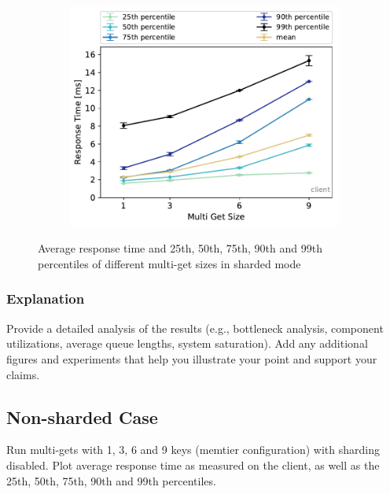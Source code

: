 \documentclass[11pt,a4paper]{article}
\begin{document}
\begin{figure}
	\begin{subfigure}[b]{.49\linewidth}
		\centering
		\includegraphics[width=\linewidth]{data/exp51_sharded_rt_mget_perc_client.pdf}
	\end{subfigure}\hfill
	\begin{subfigure}[b]{.49\linewidth}
		
	\end{subfigure}%
	\caption{Average response time and 25th, 50th, 75th, 90th and 99th percentiles of different multi-get sizes in sharded mode}
\end{figure}

\subsubsection{Explanation}

Provide a detailed analysis of the results (e.g., bottleneck analysis, component utilizations, average queue lengths, system saturation). Add any additional figures and experiments that help you illustrate your point and support your claims.

\subsection{Non-sharded Case}

Run multi-gets with 1, 3, 6 and 9 keys (memtier configuration) with sharding disabled. Plot average response time as measured on the client, as well as the 25th, 50th, 75th, 90th and 99th percentiles.
\end{document}
